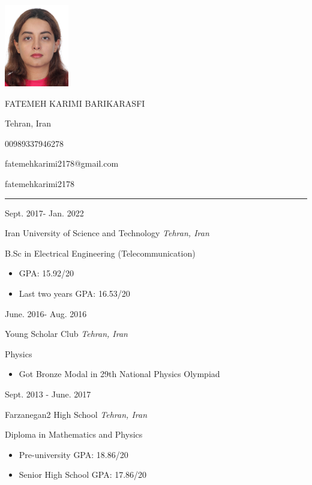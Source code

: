 \documentclass[a4paper,10pt]{article}
\newlength{\cvcolumngapwidth}
\newlength{\cvleftcolumnwidth}
\newlength{\cvrightcolumnwidth}
\newcommand{\cvnamestyle}[1]{{\Large\cvnamefont\textcolor{cvnamecolor}{#1}}}
\newcommand{\cvsectionstyle}[1]{{\normalsize\cvsectionfont\textcolor{cvsectioncolor}{#1}}}
\newcommand{\cvtitlestyle}[1]{{\large\cvtitlefont\textcolor{cvtitlecolor}{#1}}}
\newcommand{\cvdurationstyle}[1]{{\small\cvdurationfont\textcolor{cvdurationcolor}{#1}}}
\newlength{\cvafteritemskipamount}
\newlength{\cvaftersectionskipamount}
\newlength{\cvafternameskipamount}
\newlength{\cvafterpersonalinfolineskipamount}
\newlength{\cvaftertitleskipamount}
\newlength{\cvparskip}
\newcommand{\cvpersonalinfo}[2]{
    \begin{minipage}[t]{\cvleftcolumnwidth}
        \vspace{0mm} %
        \raggedleft #1
    \end{minipage}%
    \hspace{\cvcolumngapwidth}%
    \begin{minipage}[t]{\cvrightcolumnwidth}
        \vspace{0mm} %
        #2
    \end{minipage}

    \vspace{\cvafteritemskipamount}
}
\newcommand{\cvname}[1]{
    \cvnamestyle{#1}

    \vspace{\cvafternameskipamount}
}
\newcommand{\cvpersonalinfolinewithicon}[3]{
    \raisebox{.5\fontcharht\font`E-.5\height}{\texttt{[image: \#2]}}
    #3

    \vspace{\cvafterpersonalinfolineskipamount}
}
\newcommand{\cvsection}[1]{
    \begin{minipage}[t]{\cvleftcolumnwidth}
        \raggedleft\cvsectionstyle{#1}
    \end{minipage}%
    \hspace{\cvcolumngapwidth}%
    \begin{minipage}[t]{\cvrightcolumnwidth}
        \textcolor{cvrulecolor}{\rule{\cvrightcolumnwidth}{0.3mm}}
    \end{minipage}

    \vspace{\cvaftersectionskipamount}
}
\newcommand{\cvitem}[2]{
    \begin{minipage}[t]{\cvleftcolumnwidth}
        \raggedleft #1
    \end{minipage}%
    \hspace{\cvcolumngapwidth}%
    \begin{minipage}[t]{\cvrightcolumnwidth}
        \setlength{\parskip}{\cvparskip} #2
    \end{minipage}

    \vspace{\cvafteritemskipamount}
}
\newcommand{\cvtitle}[1]{
    \cvtitlestyle{#1}

    \vspace{\cvaftertitleskipamount}
    \vspace{-\cvparskip}
}
\begin{document}

\cvpersonalinfo{
    \includegraphics[height=36mm]{PassportPhoto.jpg}
}{
    \cvname{FATEMEH KARIMI BARIKARASFI}

    \cvpersonalinfolinewithicon{height=4mm}{072-location.pdf}{
        Tehran, Iran
    }

    \cvpersonalinfolinewithicon{height=4mm}{067-phone.pdf}{
        00989337946278
    }

    \cvpersonalinfolinewithicon{height=4mm}{070-envelop.pdf}{
        fatemehkarimi2178@gmail.com
    }

    \cvpersonalinfolinewithicon{height=4mm}{458-linkedin.pdf}{
        fatemehkarimi2178
    }

}

\cvsection{Education}
\cvitem{
    \cvdurationstyle{ Sept. 2017- Jan. 2022}
}{
    \cvtitle{{Iran University of Science and Technology} \hfill{\textnormal{\textit{Tehran, Iran}}}}
    B.Sc in Electrical Engineering (Telecommunication)
    \begin{itemize}[leftmargin=*]
        \item GPA: 15.92/20
        \item Last two years GPA: 16.53/20
    \end{itemize}
}

\cvitem{
    \cvdurationstyle{June. 2016- Aug. 2016}
}{
    \cvtitle{{Young Scholar Club} \hfill{\textnormal{\textit{Tehran, Iran}}}}
    Physics
    \begin{itemize}[leftmargin=*]
        \item Got Bronze Modal in 29th National Physics Olympiad
    \end{itemize}
}

\cvitem{
    \cvdurationstyle{ Sept. 2013 - June. 2017}
}{
    \cvtitle{{Farzanegan2 High School} \hfill{\textnormal{\textit{Tehran, Iran}}}}
    Diploma in Mathematics and Physics
    \begin{itemize}[leftmargin=*]
        \item Pre-university GPA: 18.86/20
        \item Senior High School GPA: 17.86/20
    \end{itemize}
}
\end{document}
